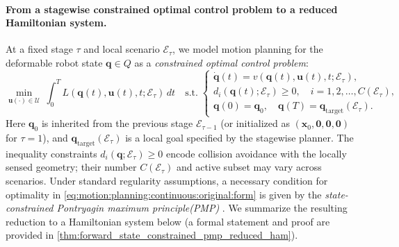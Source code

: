 \documentclass{article} %
\let\vec=\boldsymbol
\begin{document}
\paragraph{From a stagewise constrained optimal control problem to a reduced Hamiltonian system.}
At a fixed stage $\tau$ and local scenario $\mathcal E_\tau$, we model motion planning for the deformable robot state
$\vec q\in Q$ as a \emph{constrained optimal control problem}:
\begin{equation}
\label{eq:motion:planning:continuous:original:form}
\min_{\vec u(\cdot)\in\mathcal U}\ \int_0^{T} L(\vec q(t),\vec u(t),t;\mathcal E_\tau)\,dt
\quad
\text{s.t.}\;
\begin{cases}
\dot{\vec q}(t)= v(\vec q(t),\vec u(t),t;\mathcal E_\tau), \\
d_i(\vec q(t);\mathcal E_\tau)\ge 0,\quad i=1,2,\ldots, C(\mathcal E_\tau), \\
\vec q(0)=\vec q_0,\quad \vec q(T)=\vec q_{\text{target}}(\mathcal E_\tau).
\end{cases}
\end{equation}
Here $\vec q_0$ is inherited from the previous stage $\mathcal E_{\tau-1}$ (or initialized as $(\vec x_0,\vec 0,\vec 0,\vec 0)$ for $\tau=1$),
and $\vec q_{\text{target}}(\mathcal E_\tau)$ is a local goal specified by the stagewise planner.
The inequality constraints $d_i(\vec q;\mathcal E_\tau)\ge 0$ encode collision avoidance with the locally sensed geometry;
their number $C(\mathcal E_\tau)$ and active subset may vary across scenarios.
Under standard regularity assumptions, a necessary condition for optimality in \cref{eq:motion:planning:continuous:original:form}
is given by the \emph{state-constrained Pontryagin maximum principle(PMP)} \citep{FERREIRA1994whenpmp, hartl1995survey, pearson1966discrete}.
We summarize the resulting reduction to a Hamiltonian system below (a formal statement and proof are provided in
\cref{thm:forward_state_constrained_pmp_reduced_ham}).
\end{document}
